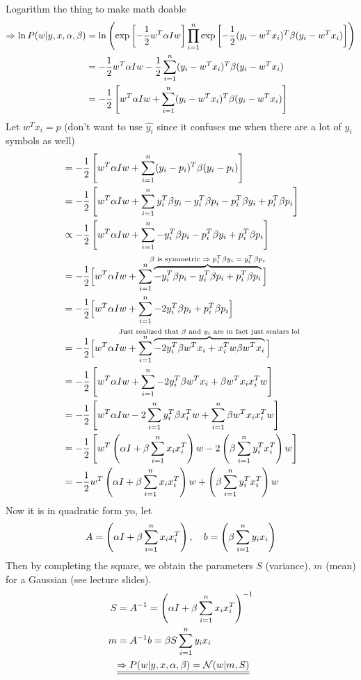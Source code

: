 \documentclass[12pt]{article}
\begin{document}
Logarithm the thing to make math doable
\begin{align}
    \Rightarrow \ln P(w|y, x, \alpha, \beta) &= \ln \left( \exp \left[ -{\frac{1}{2}} w^T \alpha I w \right] \prod\limits_{i=1}^{n} \exp \left[ -{\frac{1}{2}} (y_i - w^T x_i)^T \beta (y_i - w^T x_i) \right] \right) \\ 
    &= -\frac{1}{2} w^T \alpha I w -\frac{1}{2} \sum\limits_{i=1}^{n} (y_i - w^T x_i)^T \beta (y_i - w^T x_i) \\ 
    &= -\frac{1}{2} \left[ w^T \alpha I w + \sum\limits_{i=1}^{n} (y_i - w^T x_i)^T \beta (y_i - w^T x_i) \right] 
\end{align}
Let $w^T x_i = p$ (don't want to use $\hat{y_i}$ since it confuses me when there are a lot of $y_i$ symbols as well)
\begin{align}
    &= -\frac{1}{2} \left[ w^T \alpha I w + \sumlim{1}{n} (y_i - p_i)^T \beta (y_i - p_i) \right] \\
    &= -\frac{1}{2} \left[ w^T \alpha I w + \sumlim{1}{n} y_i^T \beta y_i - y_i^T \beta p_i - p_i^T \beta y_i + p_i^T \beta p_i \right] \\
    &\propto -\frac{1}{2} \left[ w^T \alpha I w + \sumlim{1}{n} - y_i^T \beta p_i - p_i^T \beta y_i + p_i^T \beta p_i \right] \\
    &= -\frac{1}{2} \Big[ w^T \alpha I w + \sumlim{1}{n} \overtext{- y_i^T \beta p_i - y_i^T \beta p_i + p_i^T \beta p_i}{$\beta$ is symmetric $\Rightarrow p_i^T \beta y_i = y_i^T \beta p_i$} \Big] \\
    &= -\frac{1}{2} \Big[ w^T \alpha I w + \sumlim{1}{n} - 2 y_i^T \beta p_i + p_i^T \beta p_i \Big] \\
    &= -\frac{1}{2} \Big[ w^T \alpha I w + \sumlim{1}{n} \overtext{- 2 y_i^T \beta w^Tx_i + x_i^Tw \beta w^Tx_i}{Just realized that $\beta$ and $y_i$ are in fact just scalars lol} \Big] \\
    &= -\frac{1}{2} \enclb{w^T \alpha I w + \sumlim{1}{n} - 2 y_i^T \beta w^Tx_i + \beta w^T x_i x_i^T w} \\
    &= -\frac{1}{2} \enclb{w^T \alpha I w - 2 \sumlim{1}{n} y_i^T \beta x_i^Tw + \sumlim{1}{n} \beta w^T x_i x_i^T w} \\
    &= -\frac{1}{2} \enclb{w^T \enclp{\alpha I + \beta \sumlim{1}{n} x_ix_i^T} w - 2 \enclp{\beta \sumlim{1}{n} y_i^T x_i^T} w} \\ 
    &= -\frac{1}{2} w^T \enclp{\alpha I + \beta \sumlim{1}{n} x_ix_i^T} w + \enclp{\beta \sumlim{1}{n} y_i^T x_i^T} w
\end{align}
Now it is in quadratic form yo, let 
\begin{align}
    A = \left(\alpha I + \beta \sum\limits_{i=1}^{n} x_i x_i^T\right), \quad b = \left(\beta \sum\limits_{i=1}^{n} y_i x_i\right) 
\end{align}
Then by completing the square, we obtain the parameters $S$ (variance), $m$ (mean) for a Gaussian (see lecture slides).
\begin{align}
S &= A^{-1} = \left(\alpha I + \beta \sum\limits_{i=1}^{n} x_i x_i^T\right)^{-1} \\
m &= A^{-1} b = \beta S \sum\limits_{i=1}^{n} y_i x_i \\ 
&\underline{\underline{\Rightarrow P(w|y,x,\alpha,\beta) = \mathcal{N}(w|m,S)}}
\end{align}
\end{document}
